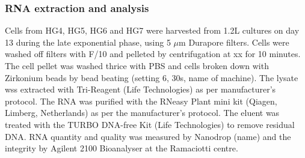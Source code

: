 \documentclass[12pt]{article}
\begin{document}
\subsubsection{RNA extraction and analysis}
Cells from HG4, HG5, HG6 and HG7 were harvested from 1.2L cultures on day 13 during the late exponential phase, using 5 $\mu$m Durapore filters. Cells were washed off filters with F/10 and pelleted by centrifugation at xx for 10 minutes. The cell pellet was washed thrice with PBS and cells broken down with Zirkonium beads by bead beating (setting 6, 30s, name of machine). The lysate wss extracted with Tri-Reagent (Life Technologies) as per manufacturer's protocol. The RNA was purified with the RNeasy Plant mini kit (Qiagen, Limberg, Netherlands) as per the manufacturer's protocol. The eluent was treated with the TURBO DNA-free Kit (Life Technologies) to remove residual DNA. RNA quantity and quality was measured by Nanodrop (name) and the integrity by Agilent 2100 Bioanalyser  at the Ramaciotti centre.








\end{document}
